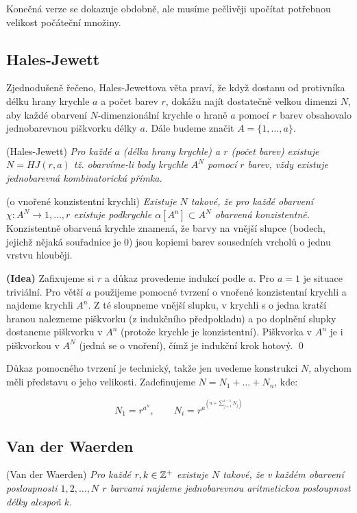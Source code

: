 Konečná verze se dokazuje obdobně, ale musíme pečlivěji upočítat potřebnou velikost počáteční množiny.

\subsection{Hales-Jewett}

Zjednodušeně řečeno, Hales-Jewettova věta praví, že když dostanu od protivníka délku hrany krychle $a$ a počet barev $r$, dokážu najít dostatečně velkou dimenzi $N$, aby každé obarvení $N$-dimenzionální krychle o hraně $a$ pomocí $r$ barev obsahovalo jednobarevnou piškvorku délky $a$. Dále budeme značit $A = \{1, \dots, a\}$.

\vt (Hales-Jewett) {\it Pro každé $a$ (délka hrany krychle) a $r$ (počet barev) existuje $N = HJ(r,a)$ tž. obarvíme-li body krychle $A^N$ pomocí $r$ barev, vždy existuje jednobarevná kombinatorická přímka.}

\tv (o vnořené konzistentní krychli) {\it Existuje $N$ takové, že pro každé obarvení $\chi: A^N \rightarrow {1,\dots, r}$ existuje podkrychle $\alpha[A^n] \subset A^N$ obarvená konzistentně.} Konzistentně obarvená krychle znamená, že barvy na vnější slupce (bodech, jejichž nějaká souřadnice je 0) jsou kopiemi barev sousedních vrcholů o jednu vrstvu hlouběji.

\dk \textbf{(Idea)} Zafixujeme si $r$ a důkaz provedeme indukcí podle $a$. Pro $a=1$ je situace triviální. Pro větší $a$ použijeme pomocné tvrzení o vnořené konzistentní krychli a najdeme krychli $A^n$. Z té sloupneme vnější slupku, v krychli s o jedna kratší hranou nalezneme piškvorku (z indukčního předpokladu) a po doplnění slupky dostaneme piškvorku v $A^n$ (protože krychle je konzistentní). Piškvorka v $A^n$ je i piškvorkou v $A^N$ (jedná se o vnoření), čímž je indukční krok hotový.
\qed

Důkaz pomocného tvrzení je technický, takže jen uvedeme konstrukci $N$, abychom měli představu o jeho velikosti. Zadefinujeme $N = N_1 + \dots + N_n$, kde:

$$N_1 = r^{a^n},\qquad N_i = r^{a^{\left(n+\sum_{j=1}^{i-1} N_j\right)}}$$

\subsection{Van der Waerden}

\vt (Van der Waerden) {\it Pro každé $r, k \in \mathbb{Z}^+$ existuje $N$ takové, že v každém obarvení posloupnosti ${1, 2, \dots, N}$ $r$ barvami najdeme jednobarevnou aritmetickou posloupnost délky alespoň $k$.}

